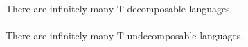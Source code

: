 



\square

\paragraph{}
\cdosledok There are infinitely many T-decomposable languages.

\paragraph{}
\cveta There are infinitely many T-undecomposable languages.

